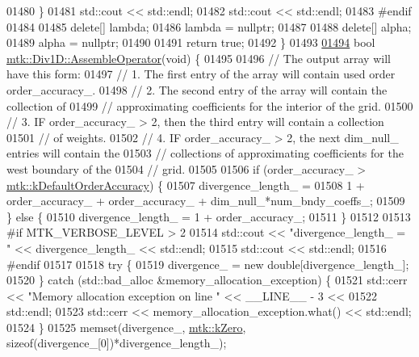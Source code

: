 \begin{DoxyCode}
{{01480   \}
01481   std::cout << std::endl;
01482   std::cout << std::endl;
01483 \textcolor{preprocessor}{  #endif}
01484 
01485   \textcolor{keyword}{delete}[] lambda;
01486   lambda = \textcolor{keyword}{nullptr};
01487 
01488   \textcolor{keyword}{delete}[] alpha;
01489   alpha = \textcolor{keyword}{nullptr};
01490 
01491   \textcolor{keywordflow}{return} \textcolor{keyword}{true};
01492 \}
01493 
\hypertarget{mtk__div__1d_8cc_source_l01494}{}\hyperlink{classmtk_1_1Div1D_a5a12482e1ceac232339dd8f647af886b}{01494} \textcolor{keywordtype}{bool} \hyperlink{classmtk_1_1Div1D_a5a12482e1ceac232339dd8f647af886b}{mtk::Div1D::AssembleOperator}(\textcolor{keywordtype}{void}) \{
01495 
01496   \textcolor{comment}{// The output array will have this form:}
01497   \textcolor{comment}{// 1. The first entry of the array will contain used order order\_accuracy\_.}
01498   \textcolor{comment}{// 2. The second entry of the array will contain the collection of}
01499   \textcolor{comment}{// approximating coefficients for the interior of the grid.}
01500   \textcolor{comment}{// 3. IF order\_accuracy\_ > 2, then the third entry will contain a collection}
01501   \textcolor{comment}{// of weights.}
01502   \textcolor{comment}{// 4. IF order\_accuracy\_ > 2, the next dim\_null\_ entries will contain the}
01503   \textcolor{comment}{// collections of approximating coefficients for the west boundary of the}
01504   \textcolor{comment}{// grid.}
01505 
01506   \textcolor{keywordflow}{if} (order\_accuracy\_ > \hyperlink{group__c01-roots_ga0d95560098eb36420511103637b6952f}{mtk::kDefaultOrderAccuracy}) \{
01507     divergence\_length\_ =
01508       1 + order\_accuracy\_ + order\_accuracy\_ + dim\_null\_*num\_bndy\_coeffs\_;
01509   \} \textcolor{keywordflow}{else} \{
01510     divergence\_length\_ = 1 + order\_accuracy\_;
01511   \}
01512 
01513 \textcolor{preprocessor}{  #if MTK\_VERBOSE\_LEVEL > 2}
01514   std::cout << \textcolor{stringliteral}{"divergence\_length\_ = "} << divergence\_length\_ << std::endl;
01515   std::cout << std::endl;
01516 \textcolor{preprocessor}{  #endif}
01517 
01518   \textcolor{keywordflow}{try} \{
01519     divergence\_ = \textcolor{keyword}{new} \textcolor{keywordtype}{double}[divergence\_length\_];
01520   \} \textcolor{keywordflow}{catch} (std::bad\_alloc &memory\_allocation\_exception) \{
01521     std::cerr << \textcolor{stringliteral}{"Memory allocation exception on line "} << \_\_LINE\_\_ - 3 <<
01522       std::endl;
01523     std::cerr << memory\_allocation\_exception.what() << std::endl;
01524   \}
01525   memset(divergence\_, \hyperlink{group__c01-roots_ga59a451a5fae30d59649bcda274fea271}{mtk::kZero}, \textcolor{keyword}{sizeof}(divergence\_[0])*divergence\_length\_);
}}
\end{DoxyCode}
